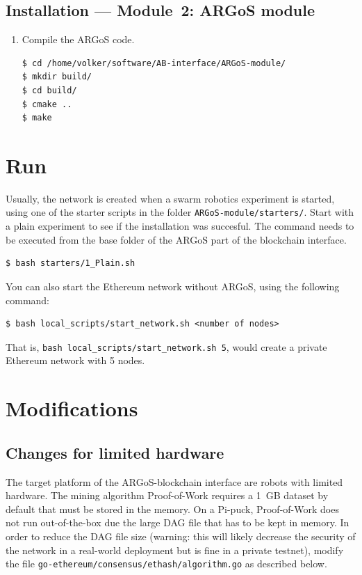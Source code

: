 \documentclass{article}
\begin{document}
\subsection{Installation --- Module~2: ARGoS module}

\begin{enumerate}
\item Compile the ARGoS code.
\begin{verbatim}
$ cd /home/volker/software/AB-interface/ARGoS-module/
$ mkdir build/
$ cd build/
$ cmake ..
$ make
\end{verbatim}
\end{enumerate}
  
\section{Run}

Usually, the network is created when a swarm robotics experiment is
started, using one of the starter scripts in the folder
\verb|ARGoS-module/starters/|. Start with a plain
experiment to see if the installation was succesful. The command needs
to be executed from the base folder of the ARGoS part of the
blockchain interface.

\begin{verbatim}
$ bash starters/1_Plain.sh
\end{verbatim}

You can also start the Ethereum network without ARGoS, using
the following command:

\begin{verbatim}
$ bash local_scripts/start_network.sh <number of nodes>
\end{verbatim}

That is, \verb|bash local_scripts/start_network.sh 5|, would create a
private Ethereum network with 5 nodes.

\section{Modifications}
\label{sec:modifications}

\subsection{Changes for limited hardware}
\label{sec:limited-hardware}

The target platform of the ARGoS-blockchain interface are robots with
limited hardware. The mining algorithm Proof-of-Work requires a 1~GB
dataset by default that must be stored in the memory. On a Pi-puck,
Proof-of-Work does not run out-of-the-box due the large DAG file that
has to be kept in memory. In order to reduce the DAG file size
(warning: this will likely decrease the security of the network in a
real-world deployment but is fine in a private testnet), modify the
file \verb|go-ethereum/consensus/ethash/algorithm.go| as described below.
\end{document}
